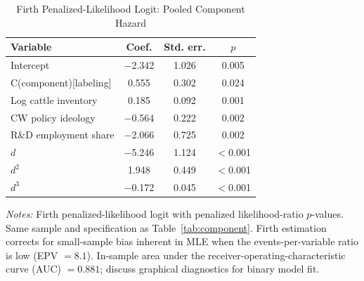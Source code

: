\documentclass[12pt]{article}
\begin{document}
\begin{table}[htbp]
\centering
\begin{threeparttable}
\caption{Firth Penalized-Likelihood Logit: Pooled Component Hazard}
\label{tab:firth}
\begin{tabular}{lccc}
\toprule
Variable & Coef. & Std. err. & $p$ \\
\midrule
Intercept                      & $-$2.342 & 1.026 & 0.005 \\
C(component)[labeling]         & 0.555 & 0.302 & 0.024 \\
Log cattle inventory            & 0.185 & 0.092 & 0.001 \\
CW policy ideology             & $-$0.564 & 0.222 & 0.002 \\
R\&D employment share           & $-$2.066 & 0.725 & 0.002 \\
$d$                            & $-$5.246 & 1.124 & $<$0.001 \\
$d^2$                          & 1.948 & 0.449 & $<$0.001 \\
$d^3$                          & $-$0.172 & 0.045 & $<$0.001 \\
\bottomrule
\end{tabular}
\begin{tablenotes}[flushleft]
\footnotesize
\item \textit{Notes:} Firth penalized-likelihood logit \citep{firth1993bias} with penalized likelihood-ratio $p$-values.  Same sample and specification as Table~\ref{tab:component}.  Firth estimation corrects for small-sample bias inherent in MLE when the events-per-variable ratio is low (EPV $= 8.1$).  In-sample area under the receiver-operating-characteristic curve (AUC) $= 0.881$; \citet{greenhill2011separation} discuss graphical diagnostics for binary model fit.
\end{tablenotes}
\end{threeparttable}
\end{table}
\end{document}
